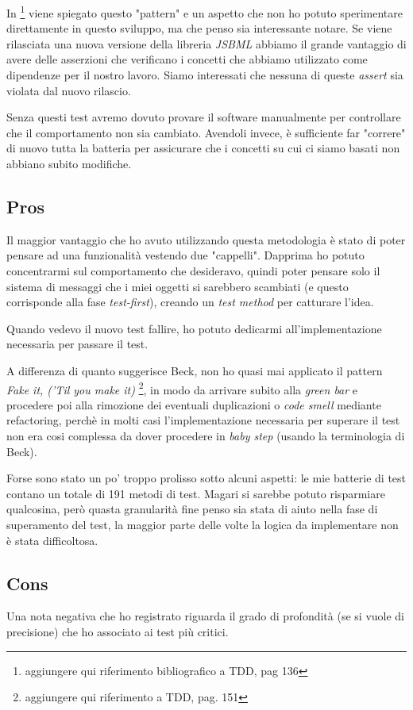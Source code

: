 In \footnote{aggiungere qui riferimento bibliografico a TDD, pag 136}
viene spiegato questo "pattern" e un aspetto che non ho potuto
sperimentare direttamente in questo sviluppo, ma che penso sia
interessante notare. Se viene rilasciata una nuova versione della
libreria \emph{JSBML} abbiamo il grande vantaggio di avere delle
asserzioni che verificano i concetti che abbiamo utilizzato come
dipendenze per il nostro lavoro. Siamo interessati che nessuna di
queste \emph{assert} sia violata dal nuovo rilascio. 

Senza questi test avremo dovuto provare il software manualmente per
controllare che il comportamento non sia cambiato. Avendoli invece,
\`e sufficiente far "correre" di nuovo tutta la batteria per
assicurare che i concetti su cui ci siamo basati non abbiano subito
modifiche.

\subsection{Pros}
Il maggior vantaggio che ho avuto utilizzando questa metodologia \`e
stato di poter pensare ad una funzionalit\`a vestendo due
"cappelli". Dapprima ho potuto concentrarmi sul comportamento che
desideravo, quindi poter pensare solo il sistema di messaggi che i
miei oggetti si sarebbero scambiati (e questo corrisponde alla fase
\emph{test-first}), creando un \emph{test method} per catturare
l'idea.

Quando vedevo il nuovo test fallire, ho potuto dedicarmi
all'implementazione necessaria per passare il test. 

A differenza di quanto suggerisce Beck, non ho quasi mai applicato il
pattern \emph{Fake it, ('Til you make it)} \footnote{aggiungere qui
  riferimento a TDD, pag. 151}, in modo da arrivare subito alla
\emph{green bar} e procedere poi alla rimozione dei eventuali
duplicazioni o \emph{code smell} mediante refactoring, perch\`e in
molti casi l'implementazione necessaria per superare il test non era
cosi complessa da dover procedere in \emph{baby step} (usando la
terminologia di Beck).

Forse sono stato un po' troppo prolisso sotto alcuni aspetti: le mie
batterie di test contano un totale di 191 metodi di test. Magari si
sarebbe potuto risparmiare qualcosina, per\`o quasta granularit\`a
fine penso sia stata di aiuto nella fase di superamento del test, la
maggior parte delle volte la logica da implementare non \`e stata
difficoltosa.

\subsection{Cons}
Una nota negativa che ho registrato riguarda il grado di profondit\`a
(se si vuole di precisione) che ho associato ai test pi\`u critici.

